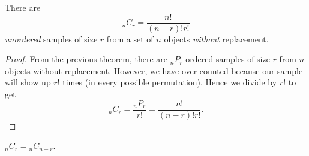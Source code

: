 \documentclass[class=article, crop=false]{standalone}
\begin{document}
  \begin{theorem}{}
    There are
    \[
      \phantom{}_nC_r = \frac{n!}{(n - r)!r!}
    \]
    \emph{unordered} samples of size $r$ from a set of $n$ objects \emph{without} replacement.
    \begin{proof}
      From the previous theorem, there are $\phantom{}_nP_r$ ordered samples of size $r$ from $n$ objects without replacement. However, we have over counted because our sample will show up $r!$ times (in every possible permutation). Hence we divide by $r!$ to get
      \[
        \phantom{}_nC_r = \frac{\phantom{}_nP_r}{r!} = \frac{n!}{(n - r)!r!}.
      \]
    \end{proof}
  \end{theorem}
  \begin{note}{}
    $\phantom{}_nC_r = \phantom{}_nC_{n - r}$.
  \end{note}
\end{document}
